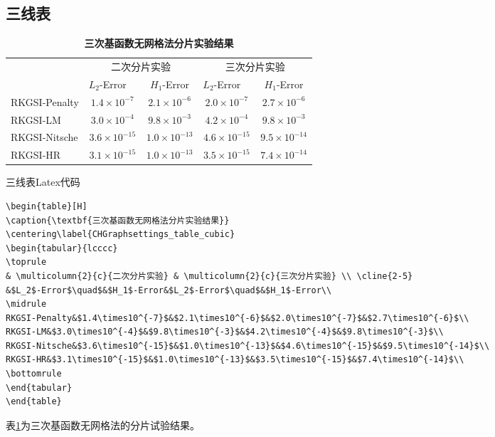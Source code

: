 \documentclass[engineeringmaster]{hquThesis}
\begin{document}
\subsection*{三线表}
\begin{table}[H]
    \caption{\textbf{三次基函数无网格法分片实验结果}}
    \centering\label{CHGraphsettings_table_cubic}
    \begin{tabular}{lcccc}
       \toprule
    & \multicolumn{2}{c}{二次分片实验} & \multicolumn{2}{c}{三次分片实验} \\ \cline{2-5}
       &$L_2$-Error$\quad$&$H_1$-Error&$L_2$-Error$\quad$&$H_1$-Error\\
       \midrule
      RKGSI-Penalty&$1.4\times10^{-7}$&$2.1\times10^{-6}$&$2.0\times10^{-7}$&$2.7\times10^{-6}$\\
      RKGSI-LM&$3.0\times10^{-4}$&$9.8\times10^{-3}$&$4.2\times10^{-4}$&$9.8\times10^{-3}$\\
      RKGSI-Nitsche&$3.6\times10^{-15}$&$1.0\times10^{-13}$&$4.6\times10^{-15}$&$9.5\times10^{-14}$\\
      RKGSI-HR&$3.1\times10^{-15}$&$1.0\times10^{-13}$&$3.5\times10^{-15}$&$7.4\times10^{-14}$\\
       \bottomrule
    \end{tabular}
    \end{table}
三线表Latex代码
\begin{lstlisting}
\begin{table}[H]
\caption{\textbf{三次基函数无网格法分片实验结果}}
\centering\label{CHGraphsettings_table_cubic}
\begin{tabular}{lcccc}
\toprule
& \multicolumn{2}{c}{二次分片实验} & \multicolumn{2}{c}{三次分片实验} \\ \cline{2-5}
&$L_2$-Error$\quad$&$H_1$-Error&$L_2$-Error$\quad$&$H_1$-Error\\
\midrule
RKGSI-Penalty&$1.4\times10^{-7}$&$2.1\times10^{-6}$&$2.0\times10^{-7}$&$2.7\times10^{-6}$\\
RKGSI-LM&$3.0\times10^{-4}$&$9.8\times10^{-3}$&$4.2\times10^{-4}$&$9.8\times10^{-3}$\\
RKGSI-Nitsche&$3.6\times10^{-15}$&$1.0\times10^{-13}$&$4.6\times10^{-15}$&$9.5\times10^{-14}$\\
RKGSI-HR&$3.1\times10^{-15}$&$1.0\times10^{-13}$&$3.5\times10^{-15}$&$7.4\times10^{-14}$\\
\bottomrule
\end{tabular}
\end{table}    
\end{lstlisting}
表\ref{CHGraphsettings_table_cubic}为三次基函数无网格法的分片试验结果。
\end{document}
